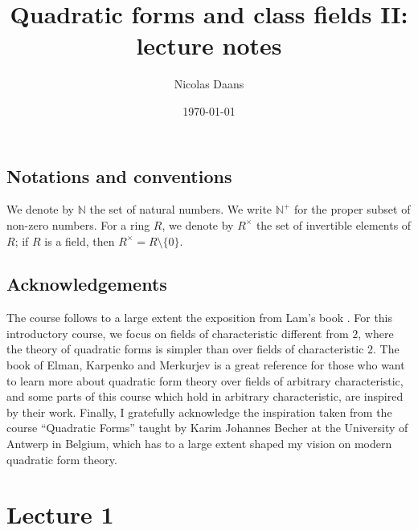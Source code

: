\documentclass[12pt, leqno, british]{amsart}
\title{Quadratic forms and class fields II: lecture notes}
\author{Nicolas Daans}
\date{\today}
\theoremstyle{definition}
\theoremstyle{plain}
\theoremstyle{remark}
\newcommand{\mbb}{\mathbb}
\newcommand{\nat}{\mbb N}
\begin{document}
\maketitle
\tableofcontents

\subsection*{Notations and conventions}
We denote by $\nat$ the set of natural numbers.
We write $\nat^+$ for the proper subset of non-zero numbers.
For a ring $R$, we denote by $R^\times$ the set of invertible elements of $R$; if $R$ is a field, then $R^\times = R \setminus \lbrace 0 \rbrace$.

\subsection*{Acknowledgements}
The course follows to a large extent the exposition from Lam's book \autocite{Lam}.
For this introductory course, we focus on fields of characteristic different from $2$, where the theory of quadratic forms is simpler than over fields of characteristic $2$.
The book of Elman, Karpenko and Merkurjev \autocite{ElmanKarpenkoMerkurjev} is a great reference for those who want to learn more about quadratic form theory over fields of arbitrary characteristic, and some parts of this course which hold in arbitrary characteristic, are inspired by their work.
Finally, I gratefully acknowledge the inspiration taken from the course ``Quadratic Forms'' taught by Karim Johannes Becher at the University of Antwerp in Belgium, which has to a large extent shaped my vision on modern quadratic form theory.

\section{Lecture 1}
\end{document}
